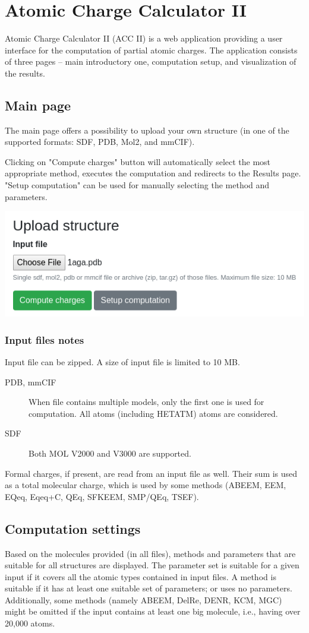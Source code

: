 \documentclass[oneside]{memoir}
\begin{document}
\chapter*{Atomic Charge Calculator \textcolor{ACCgreen}{II}}
Atomic Charge Calculator II (ACC II) is a web application providing a user interface for the computation of partial atomic charges. The application consists of three pages – main introductory one, computation setup, and visualization of the results.

\section*{Main page}
The main page offers a possibility to upload your own structure (in one of the supported formats: SDF, PDB, Mol2, and mmCIF).

Clicking on "Compute charges" button will automatically select the most appropriate method, executes the computation and redirects to the Results page. "Setup computation" can be used for manually selecting the method and parameters.

\begin{center}
    \includegraphics[width=.5\linewidth]{images/upload.png}
\end{center}

\subsection*{Input files notes}
Input file can be zipped. A size of input file is limited to 10 MB.
\begin{description}
\item[PDB, mmCIF] When file contains multiple models, only the first one is used for computation. All atoms (including HETATM) atoms are considered.
\item[SDF] Both MOL V2000 and V3000 are supported.
\end{description}

Formal charges, if present, are read from an input file as well. Their sum is used as a total molecular charge, which is used by some methods (ABEEM, EEM, EQeq, Eqeq+C, QEq, SFKEEM, SMP/QEq, TSEF).

\section*{Computation settings}
Based on the molecules provided (in all files), methods and parameters that are suitable for all structures are displayed. The parameter set is suitable for a given input if it covers all the atomic types contained in input files. A method is suitable if it has at least one suitable set of parameters; or uses no parameters. Additionally, some methods (namely ABEEM, DelRe, DENR, KCM, MGC) might be omitted if the input contains at least one big molecule, i.e., having over 20,000 atoms.
\end{document}
